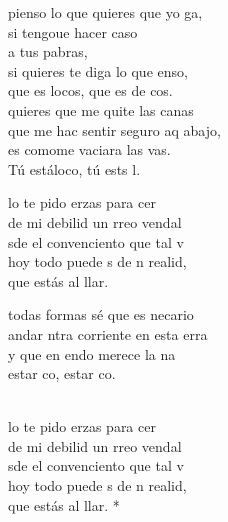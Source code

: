 \begin{cancion}%
	 pienso lo que quieres que yo ga,\\
	si tengoue hacer caso \\
	a tus pabras,\\
	si quieres te diga lo que enso,\\
	que es  locos, que es de cos.\\
	\jump
	 quieres que me quite las canas\\
	que me hac sentir seguro aq abajo, \\
	es comome vaciara las vas.\\
	Tú estáloco, tú ests l.\jump\\
	\begin{chorus}%
		lo te pido erzas para cer \\
		de mi debilid un rreo vendal\\
		sde el convenciento que tal v\\
		hoy todo puede s de n realid,\\
		que  estás al llar.  \jump\\
	\end{chorus}%
	 todas formas sé que es necario\\
	andar ntra corriente en esta erra\\
	y que en endo merece la na\\
	estar co, estar co.\\
	\jumjump\\
	\begin{chorus}%
		lo te pido erzas para cer \\
		de mi debilid un rreo vendal\chord{Mi}{7}{.  }\\
		sde el convenciento que tal v\chord{Mi}{}{ez}\\
		hoy todo puede s de n reali\chord{La}{}{da}d,\\
		que  estás al llar. *\jump\\
	\end{chorus}%
	\jump
\end{cancion}%
